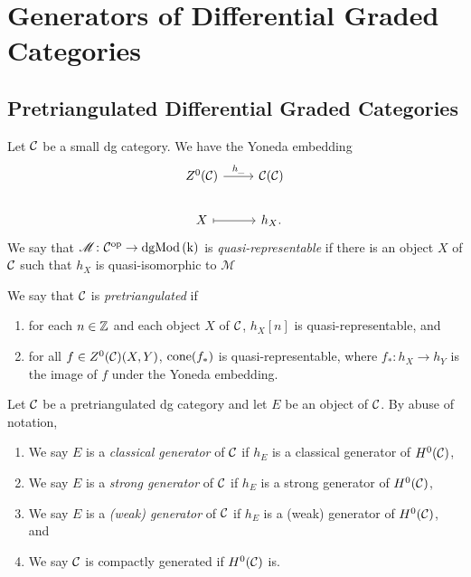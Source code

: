 \documentclass[dissertation.tex]{subfiles}
\begin{document}
\section{Generators of Differential Graded Categories}
\subsection{Pretriangulated Differential Graded Categories}

\begin{defn}
  Let $\mathcal{C}$ be a small dg category.
  We have the Yoneda embedding 
  $$\begin{tikzcd}
    Z^0(\C) \arrow{r}{h_{\_}} & \mathcal{C}(\C)\\
    X \arrow[mapsto]{r} & h_X.
  \end{tikzcd}$$
  We say that $\mathscr{M} \colon \mathcal{C}^\text{op} \rightarrow \operatorname{dgMod\left(k\right)}$ is {\it quasi-representable} if there is an object $X$ of $\mathcal{C}$ such that $h_X$ is quasi-isomorphic to $\mathscr{M}$
  
  We say that $\mathcal{C}$ is {\it pretriangulated} if
  \begin{enumerate}
  \item
    for each $n \in \mathbb{Z}$ and each object $X$ of $\mathcal{C}$, $h_X[n]$ is quasi-representable, and
  \item
    for all $f \in Z^0(\mathcal{C})(X,Y)$, $\operatorname{cone}(f_*)$ is quasi-representable, where $f_* : h_X \rightarrow h_Y$ is the image of $f$ under the Yoneda embedding.
  \end{enumerate}
\end{defn}

\begin{defn}
  Let $\mathcal{C}$ be a pretriangulated dg category and let $E$ be an object of $\mathcal{C}$.
  By abuse of notation, 
  \begin{enumerate}
  \item
    We say $E$ is a {\it classical generator} of $\mathcal{C}$ if $h_E$ is a classical generator of $H^0(\mathcal{C})$,
  \item
    We say $E$ is a {\it strong generator} of $\mathcal{C}$ if $h_E$ is a strong generator of $H^0(\mathcal{C})$,
  \item
    We say $E$ is a {\it (weak) generator} of $\mathcal{C}$ if $h_E$ is a (weak) generator of $H^0(\mathcal{C})$, and
  \item
    We say $\mathcal{C}$ is compactly generated if $H^0(\mathcal{C})$ is.
  \end{enumerate}
\end{defn}

\end{document}
